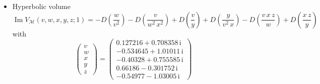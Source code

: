 \documentclass[12pt,reqno]{amsart}
\numberwithin{equation}{section}
\renewcommand{\Im}{\operatorname{Im}}
\newcommand{\I}{\mathrm{i}}
\begin{document}
\begin{itemize}
\item Hyperbolic volume
\begin{equation*}
  \Im V_{\mathcal{M}}(v,w,x,y,z; 1)
  =
  - D\left( \frac{w}{v^2} \right)
  - D\left( \frac{ v}{w^2 \, x^2} \right)
  + D\left( \frac{ v}{y} \right)
  + D\left( \frac{y}{v^2 \, x} \right)
  - D\left( \frac{v \, x \, z}{w} \right)
  + D\left( \frac{x \, z}{y} \right)
\end{equation*}
with
\begin{equation*}
  \begin{pmatrix}
    v \\ w \\ x\\ y \\ z
  \end{pmatrix}
  =
  \begin{pmatrix}
    0.127216 + 0.708358 \, \I
    \\
    -0.534645 + 1.01011 \, \I
    \\
    -0.40328 + 0.755585 \, \I
    \\
    0.66186 - 0.301752 \, \I
    \\
    -0.54977 - 1.03005 \, \I
  \end{pmatrix}
\end{equation*}


\end{itemize}
\end{document}
